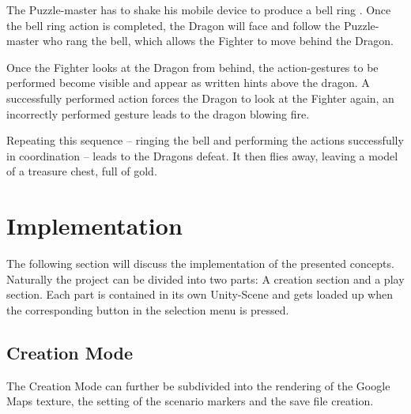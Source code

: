 \documentclass{sigchi-ext}
\begin{document}
The Puzzle-master has to shake his mobile device to produce a bell ring . Once the bell ring action is completed, the Dragon will face and follow the Puzzle-master who rang the bell, which allows the Fighter to move behind the Dragon.

Once the Fighter looks at the Dragon from behind, the action-gestures to be performed become visible and appear as written hints above the dragon. A successfully performed action forces the Dragon to look at the Fighter again, an incorrectly performed gesture leads to the dragon blowing fire. 

Repeating this sequence -- ringing the bell and performing the actions successfully in coordination -- leads to the Dragons defeat. It then flies away, leaving a model of a treasure chest, full of gold.

%		
%		

\section{Implementation}

The following section will discuss the implementation of the presented concepts. Naturally the project can be divided into two parts: A creation section and a play section. Each part is contained in its own Unity-Scene \cite{unityscene} and gets loaded up when the corresponding button in the selection menu is pressed.

\subsection{\textbf{Creation Mode}}

The Creation Mode can further be subdivided into the rendering of the Google Maps texture, the setting of the scenario markers and the save file creation.
\end{document}
